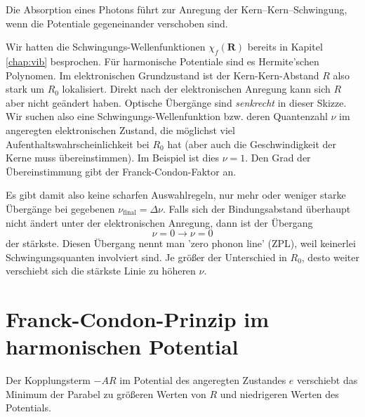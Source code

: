 \begin{marginfigure}
\caption{Die Absorption eines Photons führt zur Anregung der Kern--Kern--Schwingung, wenn die Potentiale gegeneinander verschoben sind.}
\end{marginfigure}

Wir hatten die Schwingungs-Wellenfunktionen $\chi_f(\mathbf{R})$ bereits in Kapitel \ref{chap:vib} besprochen. Für harmonische Potentiale sind es Hermite'schen Polynomen. Im elektronischen Grundzustand ist der Kern-Kern-Abstand $R$ also stark um $R_0$ lokalisiert. Direkt nach der elektronischen Anregung kann sich $R$ aber nicht geändert haben. Optische Übergänge sind \emph{senkrecht} in dieser Skizze. Wir suchen also eine Schwingungs-Wellenfunktion bzw. deren Quantenzahl $\nu$ im angeregten elektronischen Zustand, die möglichst viel Aufenthaltswahrscheinlichkeit bei $R_0$ hat (aber auch die Geschwindigkeit der Kerne muss übereinstimmen). Im Beispiel ist dies $\nu = 1$. Den Grad der Übereinstimmung gibt der Franck-Condon-Faktor an.

Es gibt damit also keine scharfen Auswahlregeln, nur mehr oder weniger starke Übergänge bei gegebenen $\nu_\text{final}  = \Delta \nu$. Falls sich der Bindungsabstand überhaupt nicht ändert unter der elektronischen Anregung, dann ist der Übergang
\begin{equation}
 \nu = 0 \rightarrow \nu = 0
\end{equation}
der stärkste. Diesen Übergang nennt man 'zero phonon line' (ZPL), weil keinerlei Schwingungsquanten involviert sind. Je größer der Unterschied in $R_0$, desto weiter verschiebt sich die stärkste Linie zu höheren $\nu$. 



\section{Franck-Condon-Prinzip im harmonischen Potential}

\begin{marginfigure}[0mm]
\caption{Der Kopplungsterm $-A R$ im Potential des angeregten Zustandes $e$ verschiebt das Minimum der Parabel zu größeren Werten von $R$ und niedrigeren Werten des Potentials. }
\end{marginfigure}

